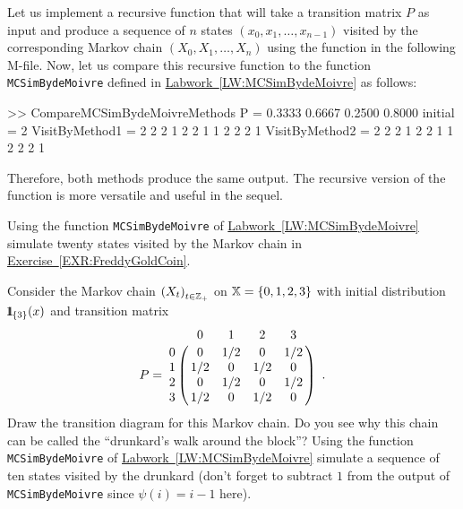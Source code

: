\begin{labwork}\label{LW:MCSimBydeMoivreRecurse}
Let us implement a recursive function that will take a transition matrix $P$ as input and produce a sequence of $n$ states $(x_0,x_1,\ldots,x_{n-1})$ visited by the corresponding Markov chain $(X_0,X_1,\ldots, X_n)$ using the function in the following M-file.
Now, let us compare this recursive function to the function {\tt MCSimBydeMoivre} defined in \hyperref[LW:MCSimBydeMoivre]{Labwork~\ref*{LW:MCSimBydeMoivre}} as follows:
\begin{VrbM}
>> CompareMCSimBydeMoivreMethods
P =
    0.3333    0.6667
    0.2500    0.8000
initial =
     2
VisitByMethod1 =
     2     2     2     1     2     2     1     1     2     2     2     1
VisitByMethod2 =
     2     2     2     1     2     2     1     1     2     2     2     1
\end{VrbM}
Therefore, both methods produce the same output.  The recursive version of the function is more versatile and useful in the sequel.
\end{labwork}

\begin{simulation}\label{SIM:FreddyGoldCoinRMR}
Using the function {\tt MCSimBydeMoivre} of \hyperref[LW:MCSimBydeMoivre]{Labwork~\ref*{LW:MCSimBydeMoivre}} simulate twenty states visited by the Markov chain in \hyperref[EXR:FreddyGoldCoin]{Exercise~\ref*{EXR:FreddyGoldCoin}}.
\end{simulation}

\begin{simulation}\label{SIM:DrunkardsWalkBlock}
Consider the Markov chain $\left(X_t\right)_{t \in \mathbb{Z}_+}$ on $\mathbb{X}=\{0,1,2,3\}$ with initial distribution ${1}\mspace{-11 mu}{1}_{\{3\}}(x)$ and transition matrix 
$$P = 
\bordermatrix{~ & 0 & 1 & 2 & 3 \cr 
0 & 0 & 1/2 & 0 & 1/2\cr
1 & 1/2 & 0 & 1/2 & 0\cr
2 & 0 & 1/2 & 0 & 1/2\cr
3 & 1/2 & 0 & 1/2 & 0 } \enspace .
$$
Draw the transition diagram for this Markov chain.  Do you see why this chain can be called the ``drunkard's walk around the block''? Using the function {\tt MCSimBydeMoivre} of \hyperref[LW:MCSimBydeMoivre]{Labwork~\ref*{LW:MCSimBydeMoivre}} simulate a sequence of ten states visited by the drunkard (don't forget to subtract $1$ from the output of {\tt MCSimBydeMoivre} since $\psi(i)=i-1$ here). 
\end{simulation}

